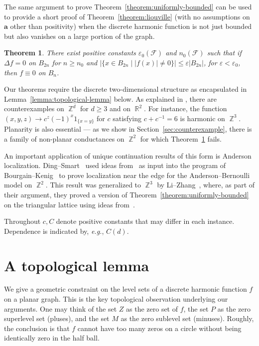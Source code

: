 \documentclass{daj}
\newtheorem{theorem}{Theorem}[section]
\newcommand{\cond}{\mathbf{a}}
\newcommand{\eps}{\varepsilon}
\DeclareMathOperator{\R}{\mathbb{R}}
\DeclareMathOperator{\Z}{\mathbb{Z}}
\newcommand{\eg}{{\it e.g.}}
\begin{document}
The same argument to prove Theorem~\ref{theorem:uniformly-bounded} can be used to provide a short proof of Theorem~\ref{theorem:liouville}
(with no assumptions on $\cond$ other than positivity) when the discrete harmonic function is not just bounded but also vanishes on a large portion of the graph.
\begin{theorem}\label{theorem:zero-case}
	There exist positive constants $\eps_0(\mathcal{F})$ and $n_0(\mathcal{F})$ such that if $\Delta f = 0$ on $B_{2 n}$ for $n \geq n_0$
	and $|\{x \in B_{2n} \mid |f(x)| \neq 0\}| \leq \eps |B_{2n}|$, for $\eps < \eps_0$, then $f \equiv 0$ on $B_n$.
\end{theorem}


Our theorems require the discrete two-dimensional structure as encapsulated in Lemma~\ref{lemma:topological-lemma} below.
As explained in \cite[Remark 1.3]{buhovsky2022discrete}, there are counterexamples on $\Z^d$ for $d \geq 3$ and on $\R^2$.
For instance, the function $(x,y,z) \to c^z (-1)^x  1_{\{x = y \}}$ for $c$ satisfying $c + c^{-1} = 6$ is harmonic on $\Z^3$. Planarity is also essential --- as we show in Section~\ref{sec:counterexample}, there is a family of non-planar conductances on $\Z^2$ for which Theorem~\ref{theorem:zero-case} fails.



An important application of unique continuation results of this form is Anderson localization. Ding--Smart~\cite{ding2020localization} used ideas from~\cite{buhovsky2022discrete} as input into the program of Bourgain--Kenig~\cite{bourgain2005localization} to prove localization near the edge for the Anderson--Bernoulli model on $\Z^2$.
This result was generalized to $\Z^3$ by Li--Zhang~\cite{li2022anderson}, where, as part of their argument, they proved a version of Theorem~\ref{theorem:uniformly-bounded} on the triangular lattice using ideas from~\cite{buhovsky2022discrete}.

\smallskip

Throughout $c, C$ denote positive constants that may differ in each instance. Dependence is indicated by, \eg, $C(d)$. 




\section{A topological lemma}\label{sec:topology}


We give a geometric constraint on the level sets of a discrete harmonic function $f$ on a planar graph. This is the key topological observation underlying our arguments. One may think of the set $Z$ as the zero set of $f$, the set $P$ as the zero superlevel set (pluses), and the set $M$ as the zero sublevel set (minuses).
Roughly, the conclusion is that $f$ cannot have too many zeros on a circle without being identically zero in the half ball.
\end{document}
